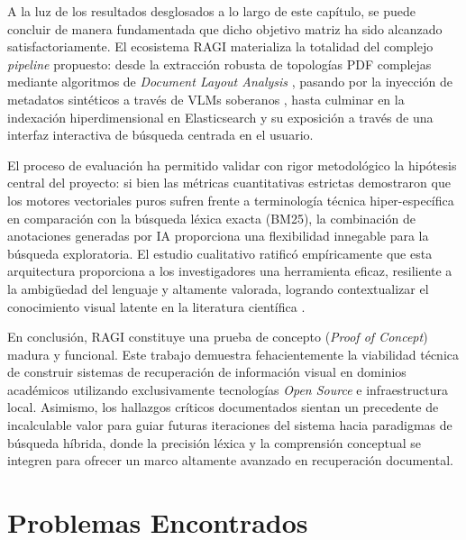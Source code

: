 \documentclass[a4paper]{report}
\begin{document}
A la luz de los resultados desglosados a lo largo de este capítulo, se puede concluir de manera fundamentada que dicho objetivo matriz ha sido alcanzado satisfactoriamente. El ecosistema RAGI materializa la totalidad del complejo \textit{pipeline} propuesto: desde la extracción robusta de topologías PDF complejas mediante algoritmos de \textit{Document Layout Analysis} \cite{zhong2019}, pasando por la inyección de metadatos sintéticos a través de VLMs soberanos \cite{liu2024}, hasta culminar en la indexación hiperdimensional en Elasticsearch y su exposición a través de una interfaz interactiva de búsqueda centrada en el usuario.

El proceso de evaluación ha permitido validar con rigor metodológico la hipótesis central del proyecto: si bien las métricas cuantitativas estrictas demostraron que los motores vectoriales puros sufren frente a terminología técnica hiper-específica en comparación con la búsqueda léxica exacta (BM25), la combinación de anotaciones generadas por IA proporciona una flexibilidad innegable para la búsqueda exploratoria. El estudio cualitativo ratificó empíricamente que esta arquitectura proporciona a los investigadores una herramienta eficaz, resiliente a la ambigüedad del lenguaje y altamente valorada, logrando contextualizar el conocimiento visual latente en la literatura científica \cite{lewis2020}. 

En conclusión, RAGI constituye una prueba de concepto (\textit{Proof of Concept}) madura y funcional. Este trabajo demuestra fehacientemente la viabilidad técnica de construir sistemas de recuperación de información visual en dominios académicos utilizando exclusivamente tecnologías \textit{Open Source} e infraestructura local. Asimismo, los hallazgos críticos documentados sientan un precedente de incalculable valor para guiar futuras iteraciones del sistema hacia paradigmas de búsqueda híbrida, donde la precisión léxica y la comprensión conceptual se integren para ofrecer un marco altamente avanzado en recuperación documental.

\begingroup
\let\clearpage\relax %
\let\newpage\relax   %
\vspace{0.5cm}       %

\section{Problemas Encontrados}
\label{sec:problemas_encontrados}
\endgroup
\end{document}

